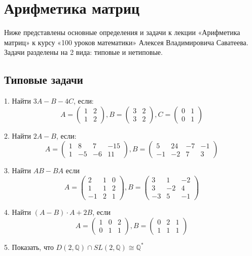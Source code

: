 \documentclass[12pt]{article}
\begin{document}
\section*{Арифметика матриц}
Ниже представлены основные определения и задачи к лекции «Арифметика матриц» к курсу «100 уроков математики» Алексея Владимировича Саватеева.
Задачи разделены на 2 вида: типовые и нетиповые.
\subsection*{Типовые задачи}
1. Найти $3A-B-4C$, если:
\[
A = \begin{pmatrix}1&2\\1&2\end{pmatrix}, 
B = \begin{pmatrix}3&2\\3&2\end{pmatrix}, 
C = \begin{pmatrix}0&1\\0&1\end{pmatrix}
\]

2. Найти $2A-B$, если:
\[
A = \begin{pmatrix}
1 & 8 & 7 & -15\\
1 & -5 & -6 & 11
\end{pmatrix},
B = \begin{pmatrix}
5 & 24 & -7 & -1\\
-1 & -2 & 7 & 3
\end{pmatrix}
\]

3. Найти $AB - BA$ если
\[
A = \begin{pmatrix}
2 & 1 & 0\\
1 & 1 & 2\\
-1 & 2 & 1
\end{pmatrix},
B = \begin{pmatrix}
3 & 1 & -2\\
3 & -2 & 4\\
-3 & 5 & -1
\end{pmatrix}
\]

4. Найти $(A-B)\cdot A+2B$, если
\[
A = \begin{pmatrix}
1 & 0 & 2\\
0 & 1 & 1
\end{pmatrix},
B = \begin{pmatrix}
0 & 2 & 1\\
1 & 1 & 1
\end{pmatrix}
\]

5. Показать, что $D(2,\mathbb{Q})\cap SL(2,\mathbb{Q}) \cong \mathbb{Q}^*$
\end{document}

